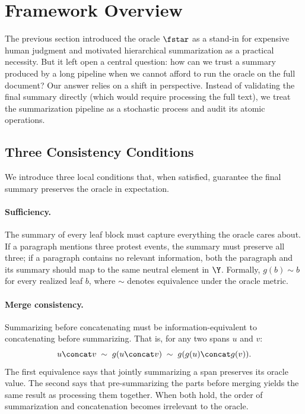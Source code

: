 \section{Framework Overview}\label{sec:overview}

The previous section introduced the oracle $\fstar$ as a stand-in for expensive human judgment and motivated hierarchical summarization as a practical necessity. But it left open a central question: how can we trust a summary produced by a long pipeline when we cannot afford to run the oracle on the full document? Our answer relies on a shift in perspective. Instead of validating the final summary directly (which would require processing the full text), we treat the summarization pipeline as a stochastic process and audit its atomic operations.

\subsection{Three Consistency Conditions}

We introduce three local conditions that, when satisfied, guarantee the final summary preserves the oracle in expectation.

\paragraph{Sufficiency.} The summary of every leaf block must capture everything the oracle cares about. If a paragraph mentions three protest events, the summary must preserve all three; if a paragraph contains no relevant information, both the paragraph and its summary should map to the same neutral element in $\Y$. Formally, $g(b) \sim b$ for every realized leaf $b$, where $\sim$ denotes equivalence under the oracle metric.

\paragraph{Merge consistency.} Summarizing before concatenating must be information-equivalent to concatenating before summarizing. That is, for any two spans $u$ and $v$:
\[
u \concat v \;\sim\; g(u \concat v) \;\sim\; g(g(u) \concat g(v)).
\]
The first equivalence says that jointly summarizing a span preserves its oracle value. The second says that pre-summarizing the parts before merging yields the same result as processing them together. When both hold, the order of summarization and concatenation becomes irrelevant to the oracle.

